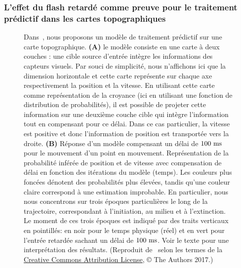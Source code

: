 \subsubsection{L'effet du flash retardé comme preuve pour le traitement
prédictif dans les cartes topographiques~\citep{KhoeiMassonPerrinet17}}
\begin{figure}%
\caption{
Dans~\citep{KhoeiMassonPerrinet17}, nous proposons un
modèle de traitement prédictif sur une carte topographique. \textbf{(A)}
le modèle consiste en une carte à deux couches : une cible source
d'entrée intègre les informations des capteurs visuels. Par souci de
simplicité, nous n'affichons ici que la dimension horizontale et cette
carte représente sur chaque axe respectivement la position et la
vitesse. En utilisant cette carte comme représentation de la croyance
(ici en utilisant une fonction de distribution de probabilités), il est
possible de projeter cette information sur une deuxième couche cible qui
intègre l'information tout en compensant pour ce délai. Dans
ce cas particulier, la vitesse est positive et donc l'information de
position est transportée vers la droite. \textbf{(B)} Réponse d'un
modèle compensant un délai de $100~\si{\milli\second}$ pour le mouvement d'un point en mouvement.
Représentation de la probabilité inférée de position et de vitesse avec
compensation de délai en fonction des itérations du modèle (temps). Les
couleurs plus foncées dénotent des probabilités plus élevées, tandis
qu'une couleur claire correspond à une estimation improbable. En
particulier, nous nous concentrons sur trois époques particulières le
long de la trajectoire, correspondant à l'initiation, au milieu et à l'extinction.
Le moment de ces trois époques est indiqué par des traits
verticaux en pointillés: en noir pour le temps physique (réel) et en
vert pour l'entrée retardée sachant un délai de $100~\si{\milli\second}$. Voir le texte
pour une interprétation des résultats. (Reproduit de~\citep{KhoeiMassonPerrinet17} selon les termes de la
\href{https://journals.plos.org/ploscompbiol/article?id=10.1371/journal.pcbi.1005068}{Creative
Commons Attribution License}, © The Authors 2017.)
}
\label{fig:KhoeiMassonPerrinet17}
\end{figure}

